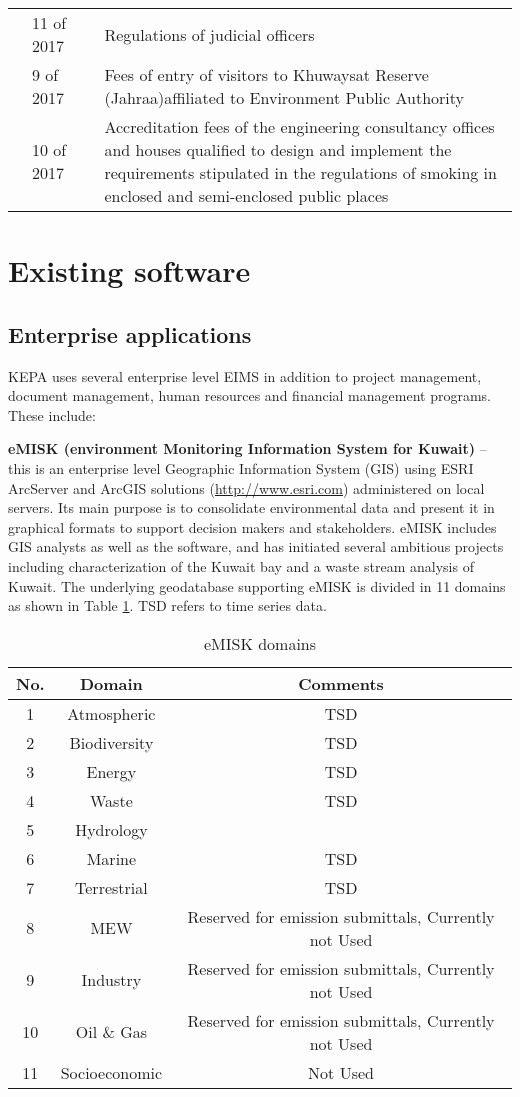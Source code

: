 \begin{table}[H]
{\begin{tabular}{@{}p{2cm}p{2cm}cp{8cm}@{}}
 & 11 of 2017 &  & Regulations of judicial officers \\
 & 9 of 2017 &  & Fees of entry of visitors to Khuwaysat Reserve (Jahraa)affiliated to Environment Public Authority \\
 & 10 of 2017 &  & Accreditation fees of the engineering consultancy offices and houses qualified to design and implement the requirements stipulated in the regulations of smoking in enclosed and semi-enclosed public places \\ \bottomrule
\end{tabular}
} %
\end{table}


\section{Existing software}
\subsection{Enterprise applications}

KEPA uses several enterprise level EIMS in addition to project management, document management, human resources and financial management programs. These include:

\textbf{eMISK (environment Monitoring Information System for Kuwait)} – this is an enterprise level Geographic Information System (GIS) using ESRI ArcServer and ArcGIS solutions (\url{http://www.esri.com}) administered on local servers. Its main purpose is to consolidate environmental data and present it in graphical formats to support decision makers and stakeholders. eMISK includes GIS analysts as well as the software, and has initiated several ambitious projects including characterization of the Kuwait bay and a waste stream analysis of Kuwait. The underlying geodatabase supporting eMISK is divided in 11 domains as shown in Table \ref{tab:emiskdomains}. TSD refers to time series data.

\begin{table}[H]
\centering
\caption{eMISK domains}
\label{tab:emiskdomains}
\begin{tabular}{@{}ccc@{}}
\toprule
\textbf{No.} & \textbf{Domain} & Comments \\ \midrule
1 & Atmospheric & TSD \\
2 & Biodiversity & TSD\\
3 & Energy & TSD \\
4 & Waste & TSD\\
5 & Hydrology \\
6 & Marine & TSD\\
7 & Terrestrial & TSD \\
8 & MEW & Reserved for emission submittals, Currently not Used \\
9 & Industry & Reserved for emission submittals, Currently not Used\\
10 & Oil \& Gas & Reserved for emission submittals, Currently not Used\\
11 & Socioeconomic & Not Used\\ \bottomrule
\end{tabular}
\end{table}

